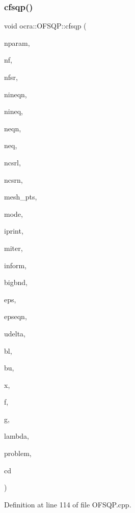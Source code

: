 \subsubsection{\texorpdfstring{cfsqp()}{cfsqp()}}
{\footnotesize\ttfamily void ocra\+::\+O\+F\+S\+Q\+P\+::cfsqp (\begin{DoxyParamCaption}\item[{int}]{nparam,  }\item[{int}]{nf,  }\item[{int}]{nfsr,  }\item[{int}]{nineqn,  }\item[{int}]{nineq,  }\item[{int}]{neqn,  }\item[{int}]{neq,  }\item[{int}]{ncsrl,  }\item[{int}]{ncsrn,  }\item[{int $\ast$}]{mesh\+\_\+pts,  }\item[{int}]{mode,  }\item[{int}]{iprint,  }\item[{int}]{miter,  }\item[{int $\ast$}]{inform,  }\item[{double}]{bigbnd,  }\item[{double}]{eps,  }\item[{double}]{epseqn,  }\item[{double}]{udelta,  }\item[{double $\ast$}]{bl,  }\item[{double $\ast$}]{bu,  }\item[{double $\ast$}]{x,  }\item[{double $\ast$}]{f,  }\item[{double $\ast$}]{g,  }\item[{double $\ast$}]{lambda,  }\item[{\hyperlink{classocra_1_1OFSQPProblem}{O\+F\+S\+Q\+P\+Problem} \&}]{problem,  }\item[{void $\ast$}]{cd }\end{DoxyParamCaption})}



Definition at line 114 of file O\+F\+S\+Q\+P.\+cpp.

\hypertarget{classocra_1_1OFSQP_adf678d1abdee7d5d337cf3698357108f}{}\label{classocra_1_1OFSQP_adf678d1abdee7d5d337cf3698357108f} 
